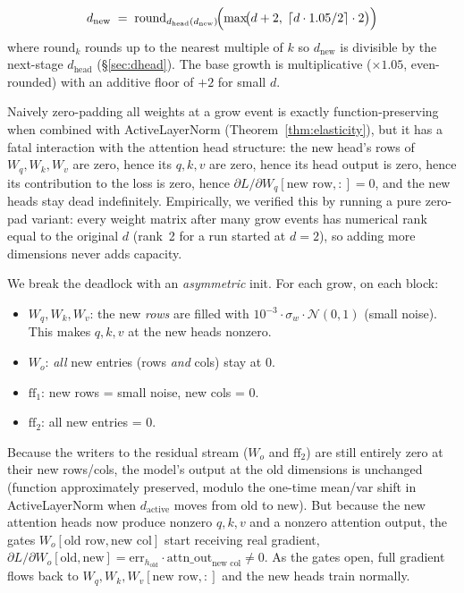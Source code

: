 \documentclass{article}
\begin{document}
\begin{equation}
d_{\text{new}} \;=\; \mathrm{round}_{d_{\text{head}}(d_{\text{new}})}\!\Bigl(
\max\!\bigl(d + 2,\; \lceil d \cdot 1.05 / 2\rceil \cdot 2\bigr)\Bigr)
\end{equation}
where $\mathrm{round}_k$ rounds up to the nearest multiple of $k$ so
$d_{\text{new}}$ is divisible by the next-stage $d_{\text{head}}$
(\S\ref{sec:dhead}).  The base growth is multiplicative
($\times 1.05$, even-rounded) with an additive floor of $+2$ for
small $d$.

Naively zero-padding all weights at a grow event is exactly
function-preserving when combined with ActiveLayerNorm
(Theorem~\ref{thm:elasticity}), but it has a fatal interaction with the
attention head structure: the new head's rows of $W_q, W_k, W_v$ are zero,
hence its $q,k,v$ are zero, hence its head output is zero, hence its
contribution to the loss is zero, hence $\partial L / \partial W_q[\text{new
row},:] = 0$, and the new heads stay dead indefinitely.  Empirically, we
verified this by running a pure zero-pad variant: every weight matrix
after many grow events has numerical rank equal to the original $d$
(rank~2 for a run started at $d=2$), so adding more dimensions never adds
capacity.

We break the deadlock with an \emph{asymmetric} init.  For each grow, on
each block:
\begin{itemize}
\item $W_q, W_k, W_v$: the new \emph{rows} are filled with
  $10^{-3} \cdot \sigma_w \cdot \mathcal{N}(0,1)$ (small noise).  This makes
  $q, k, v$ at the new heads nonzero.
\item $W_o$: \emph{all} new entries (rows \emph{and} cols) stay at $0$.
\item $\mathrm{ff}_1$: new rows = small noise, new cols = $0$.
\item $\mathrm{ff}_2$: all new entries = $0$.
\end{itemize}
Because the writers to the residual stream ($W_o$ and $\mathrm{ff}_2$) are
still entirely zero at their new rows/cols, the model's output at the old
dimensions is unchanged (function approximately preserved, modulo the
one-time mean/var shift in ActiveLayerNorm when $d_{\text{active}}$ moves
from old to new).  But because the new attention heads now produce nonzero
$q,k,v$ and a nonzero attention output, the gates
$W_o[\text{old row},\text{new col}]$ start receiving real gradient,
$\partial L / \partial W_o[\text{old},\text{new}] = \text{err}_{h_{\text{old}}}
\cdot \text{attn\_out}_{\text{new col}} \neq 0$.  As the gates open, full
gradient flows back to $W_q,W_k,W_v[\text{new row},:]$ and the new heads
train normally.
\end{document}
